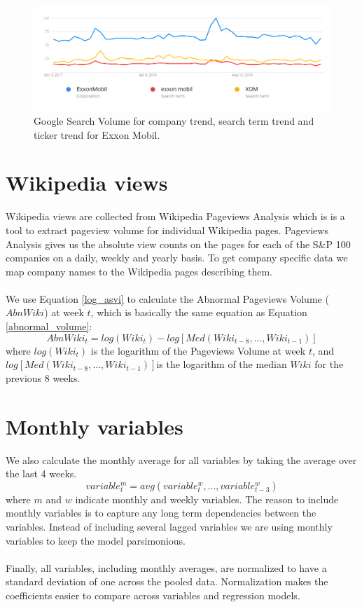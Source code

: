 \begin{figure}[h!]
  \centering
    \includegraphics[width=1\textwidth]{fig/xomStatisticsGoogleTrendsAddedExplanation.png}
 \caption{Google Search Volume for company trend, search term trend and ticker trend for Exxon Mobil.}
\label{fig:xomStatisticsGoogleTrends}
\end{figure}

\section{Wikipedia views}

Wikipedia views are collected from Wikipedia Pageviews Analysis which is is a tool to extract pageview volume for individual Wikipedia pages. Pageviews Analysis gives us the absolute view counts on the pages for each of the S\&P 100 companies on a daily, weekly and yearly basis. To get company specific data we map company names to the Wikipedia pages describing them.
\\\\
We use Equation \eqref{log_asvi} to calculate the Abnormal Pageviews Volume ($AbnWiki$) at week $t$, which is basically the same equation as Equation \eqref{abnormal_volume}:
\begin{equation}
   \label{abnormal_pageviews_volume} 
   AbnWiki_{t} = log(Wiki_{t}) - log[Med(Wiki_{t-8},...,Wiki_{t-1})] 
\end{equation}
   where $log(Wiki_{t})$ is the logarithm of the Pageviews Volume at week $t$, and $log[Med(Wiki_{t-8},...,Wiki_{t-1})]$is the logarithm of the median $Wiki$ for the previous 8 weeks.
\section{Monthly variables}
 We also calculate the monthly average for all variables by taking the average over the last 4 weeks. 
\begin{equation}
   \label{monthly_var} 
   variable^{m}_t = avg(variable^{w}_{t},...,variable^{w}_{t-3}) 
\end{equation}
where $m$ and $w$ indicate monthly and weekly variables. The reason to include monthly variables is to capture any long term dependencies between the variables. Instead of including several lagged variables we are using monthly variables to keep the model parsimonious.
\\\\
Finally, all variables, including monthly averages, are normalized to have a standard deviation of one across the pooled data. Normalization makes the coefficients easier to compare across variables and regression models.

